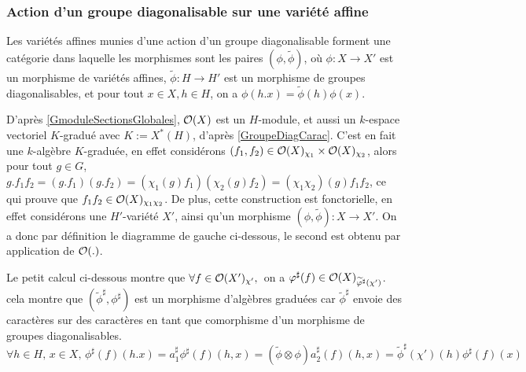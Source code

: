 \subsubsection{Action d'un groupe diagonalisable sur une variété affine}

Les variétés affines munies d'une action d'un groupe diagonalisable forment une catégorie dans laquelle les morphismes sont les paires $(\phi,\widetilde{\phi})$, où $\phi:X\rightarrow X'$ est un morphisme de variétés affines, $\widetilde{\phi}:H\rightarrow H'$ est un morphisme de groupes diagonalisables, et pour tout $x\in X, h\in H$, on a $\phi(h.x)=\widetilde{\phi}(h)\phi(x)$.

D'après \ref{GmoduleSectionsGlobales}, $\mathcal{O}(X)$ est un $H$-module, et aussi un $k$-espace vectoriel $K$-gradué avec $K:=X^*(H)$, d'après \ref{GroupeDiagCarac}. C'est en fait une $k$-algèbre $K$-graduée, en effet considérons $(f_1, f_2)\in \mathcal{O}(X)_{\chi_1}\times \mathcal{O}(X)_{\chi_2}$, alors pour tout $g\in G$, $g.f_1f_2=(g.f_1)(g.f_2)=(\chi_1(g)f_1)(\chi_2(g)f_2)=(\chi_1\chi_2)(g)f_1f_2$, ce qui prouve que $f_1f_2\in \mathcal{O}(X)_{\chi_1\chi_2}$. De plus, cette construction est fonctorielle, en effet considérons une $H'$-variété $X'$, ainsi qu'un morphisme $(\phi,\widetilde{\phi}):X\rightarrow X'$. On a donc par définition le diagramme de gauche ci-dessous, le second est obtenu par application de $\mathcal{O}(.)$.

\begin{multicols}{2}
	\begin{center}
	\end{center}

	\columnbreak
	\begin{center}
	\end{center}
\end{multicols}

Le petit calcul ci-dessous montre que $\forall f\in \mathcal{O}(X')_{\chi'},\,$ on a $\varphi^\sharp(f)\in \mathcal{O}(X)_{\widetilde{\varphi}^\sharp(\chi')}$. cela montre que $(\widetilde{\phi}^\sharp,\phi^\sharp)$ est un morphisme d'algèbres graduées car $\widetilde{\phi}^\sharp$ envoie des caractères sur des caractères en tant que comorphisme d'un morphisme de groupes diagonalisables. 
$$\forall h\in H,\,x\in X,\, \phi^\sharp(f)(h.x)=a_1^\sharp\phi^\sharp(f)(h, x)=(\widetilde{\phi}\otimes\phi)a_2^\sharp(f)(h,x)=\widetilde{\phi}^\sharp(\chi')(h)\phi^\sharp(f)(x)$$ 

